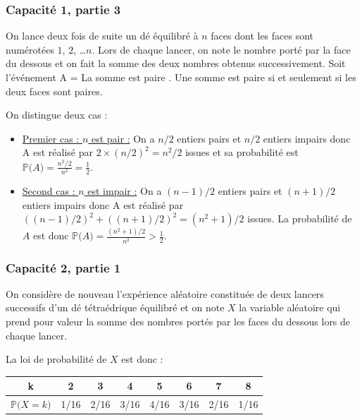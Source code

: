 \documentclass[11pt, hyperref={urlcolor=red,%
            linkcolor=blue, %
            colorlinks=true}]{beamer}
\newcommand{\proba}[1]{\mathbb{P}\big(#1\big)}
\begin{document}
\begin{frame}
\frametitle{Capacité 1,  partie 3}
On lance deux fois de suite un dé   équilibré  à $n$ faces dont les  faces sont numérotées $1$, $2$, \ldots  $n$.
Lors de chaque lancer, on note le nombre porté par la face du dessous  et on fait la somme des deux nombres obtenus successivement.
Soit  l'événement A = \og{} La somme est paire  \fg{}. Une somme est paire si et seulement si les deux faces sont paires.

On distingue deux cas :


\begin{itemize}
\pause \item \underline{Premier cas : $n$ est pair :}  On a $n/2$ entiers pairs  et $n/2$ entiers impairs donc A est réalisé par $2 \times (n/2)^{2}=n^{2}/2$ issues et sa probabilité est  $\proba{A}=\frac{n^2/2}{n^2}=\frac{1}{2}$.


\pause \item \underline{Second cas :  $n$ est impair :}  On a $(n-1)/2$ entiers pairs  et $(n+1)/2$ entiers impairs donc A est réalisé par $((n-1)/2)^{2}+((n+1)/2)^{2}=(n^{2}+1)/2$ issues. La probabilité de $A$ est  donc $\proba{A}=\frac{(n^{2}+1)/2}{n^2}>\frac{1}{2}$.
\end{itemize}



\end{frame}

 

\begin{frame}
\label{capacite2}
\frametitle{Capacité 2,  partie 1}

On considère de nouveau  l'expérience aléatoire constituée de deux lancers successifs d'un dé tétraédrique équilibré et on note $X$ la variable aléatoire qui prend pour valeur la somme des nombres portés par les faces du dessous lors de chaque lancer.

La loi de probabilité de $X$ est donc :

\begin{center}
\begin{tabular}{|c|c|c|c|c|c|c|c|}
\hline 
k & 2 & 3 & 4 & 5 & 6  & 7 & 8\\ 
\hline 
$\proba{X=k}$ & 1/16 & 2/16 & 3/16  & 4/16   &  3/16 &  2/16 &  1/16  \\ 
\hline 
\end{tabular} 
\end{center}

\end{frame}
\end{document}
